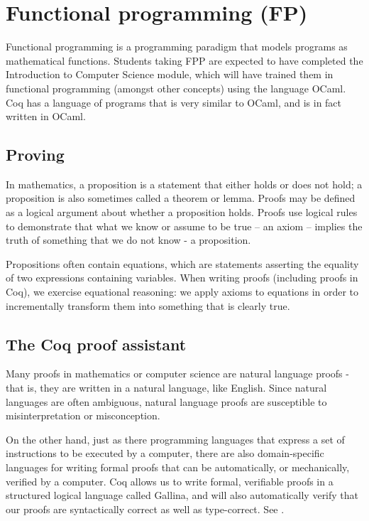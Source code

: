\section{Functional programming (FP)}
Functional programming is a programming paradigm that models programs as mathematical functions. Students taking FPP are expected to have completed the Introduction to Computer Science module, which will have trained them in functional programming (amongst other concepts) using the language OCaml. Coq has a language of programs that is very similar to OCaml, and is in fact written in OCaml.

\subsection{Proving}
In mathematics, a proposition is a statement that either holds or does not hold; a proposition is also sometimes called a theorem or lemma. Proofs may be defined as a logical argument about whether a proposition holds. Proofs use logical rules to demonstrate that what we know or assume to be true – an axiom – implies the truth of something that we do not know - a proposition.

Propositions often contain equations, which are statements asserting the equality of two expressions containing variables. When writing proofs (including proofs in Coq), we exercise equational reasoning: we apply axioms to equations in order to incrementally transform them into something that is clearly true.

\subsection{The Coq proof assistant}
Many proofs in mathematics or computer science are natural language proofs - that is, they are written in a natural language, like English. Since natural languages are often ambiguous, natural language proofs are susceptible to misinterpretation or misconception.

On the other hand, just as there programming languages that express a set of instructions to be executed by a computer, there are also domain-specific languages for writing formal proofs that can be automatically, or mechanically, verified by a computer. Coq allows us to write formal, verifiable proofs in a structured logical language called Gallina, and will also automatically verify that our proofs are syntactically correct as well as type-correct. See \cite{coq-homepage}.

